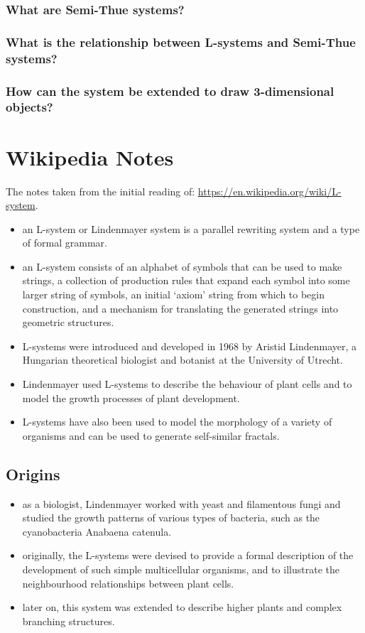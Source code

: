 \documentclass[11pt]{report}
\begin{document}
\subsection{What are Semi-Thue systems?}

\subsection{What is the relationship between L-systems and Semi-Thue systems?}

\subsection{How can the system be extended to draw 3-dimensional objects?}

\chapter{Wikipedia Notes}
The notes taken from the initial reading of:
\url{https://en.wikipedia.org/wiki/L-system}.
\begin{itemize}
    \item an L-system or Lindenmayer system is a parallel rewriting system and a type of
          formal grammar.
    \item an L-system consists of an alphabet of symbols that can be used to make
          strings, a collection of production rules that expand each symbol into some
          larger string of symbols, an initial `axiom' string from which to begin
          construction, and a mechanism for translating the generated strings into
          geometric structures.
    \item L-systems were introduced and developed in 1968 by Aristid Lindenmayer, a
          Hungarian theoretical biologist and botanist at the University of Utrecht.
    \item Lindenmayer used L-systems to describe the behaviour of plant cells and to
          model the growth processes of plant development.
    \item L-systems have also been used to model the morphology of a variety of organisms
          and can be used to generate self-similar fractals.
\end{itemize}

\section{Origins}
\begin{itemize}
    \item as a biologist, Lindenmayer worked with yeast and filamentous fungi and studied
          the growth patterns of various types of bacteria, such as the cyanobacteria
          Anabaena catenula.
    \item originally, the L-systems were devised to provide a formal description of the
          development of such simple multicellular organisms, and to illustrate the
          neighbourhood relationships between plant cells.
    \item later on, this system was extended to describe higher plants and complex
          branching structures.
\end{itemize}
\end{document}
